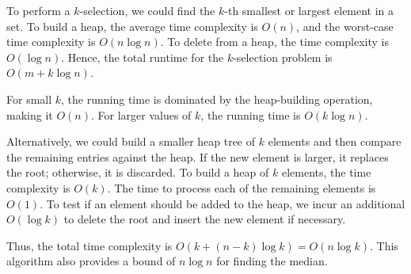 To perform a \(k\)-selection, we could find the \(k\)-th smallest or largest element in a set. To build a heap, the average time complexity is \(O(n)\), and the worst-case time complexity is \(O(n \log n)\). To delete from a heap, the time complexity is \(O(\log n)\). Hence, the total runtime for the \(k\)-selection problem is \(O(m + k \log n)\).

For small \(k\), the running time is dominated by the heap-building operation, making it \(O(n)\). For larger values of \(k\), the running time is \(O(k \log n)\).

Alternatively, we could build a smaller heap tree of \(k\) elements and then compare the remaining entries against the heap. If the new element is larger, it replaces the root; otherwise, it is discarded. To build a heap of \(k\) elements, the time complexity is \(O(k)\). The time to process each of the remaining elements is \(O(1)\). To test if an element should be added to the heap, we incur an additional \(O(\log k)\) to delete the root and insert the new element if necessary.

Thus, the total time complexity is \(O(k + (n - k) \log k) = O(n \log k)\). This algorithm also provides a bound of \(n \log n\) for finding the median.
